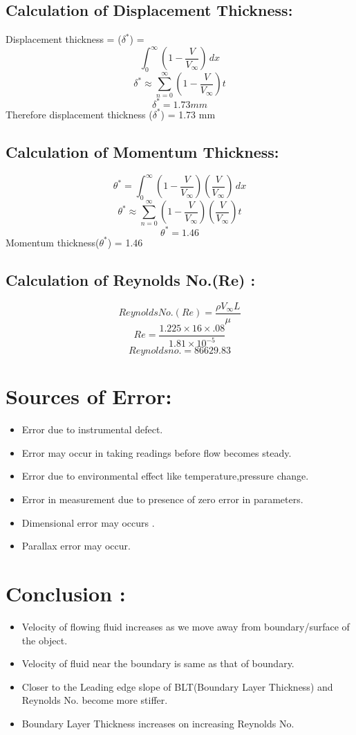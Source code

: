 \documentclass[12pt,a4paper]{article}
\begin{document}
\subsection{Calculation of Displacement Thickness:}

Displacement thickness = ($\delta^{\ast}$) = \[ \int_{0}^{\infty} (1-\frac{V}{V_{\infty}}) \,dx \]
$$ \delta^{\ast} \approx \sum_{n=0}^{\infty} (1-\frac{V}{V_{\infty}})t $$
$$ \delta^{\ast} = 1.73 mm $$ 
Therefore displacement thickness ($\delta^{\ast}$) = 1.73 mm

\subsection{Calculation of Momentum Thickness:}
$$ \theta ^{\ast} = \int_{0}^{\infty} (1-\frac{V}{V_{\infty}})(\frac{V}{V_{\infty}}) \,dx $$
$$ \theta^{\ast} \approx \sum_{n=0}^{\infty} (1-\frac{V}{V_{\infty}})(\frac{V}{V_{\infty}})t $$
$$ \theta^{\ast} =1.46 $$
Momentum thickness($\theta^{\ast}$) = 1.46 

\subsection{Calculation of Reynolds No.(Re) :}
$$ Reynolds No.(Re) = \frac{\rho V_{\infty} L}{\mu} $$
$$ Re = \frac{1.225\times16\times.08}{1.81 \times 10^{-5}} $$
$$ Reynolds no. = 86629.83 $$


\section{Sources of Error:}
\begin{itemize}
    \item Error due to instrumental defect.
    \item Error may occur in taking readings before flow becomes steady.
    \item Error due to environmental effect like temperature,pressure change.
    \item Error in measurement due to presence of zero error in parameters.
    \item Dimensional error may occurs .
    \item Parallax error may occur.
\end{itemize}



\section{Conclusion :}
\begin{itemize}
    \item Velocity of flowing fluid increases as we move away from boundary/surface of the object.
    \item Velocity of fluid near the boundary is same as that of boundary.
    \item Closer to the Leading edge slope of BLT(Boundary Layer Thickness) and Reynolds No. become more stiffer.
    \item Boundary Layer Thickness increases on increasing Reynolds No.
\end{itemize}
\end{document}
